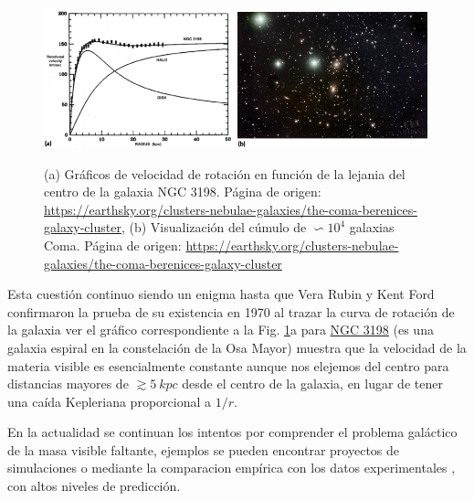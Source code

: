 \begin{figure}
\centering
\includegraphics[width=0.49\textwidth]{Fisica_de_Particulas/imagenes/fritz.png}
\includegraphics[width=0.49\textwidth]{Fisica_de_Particulas/imagenes/Coma-Cluster.jpg}
\caption{(a) Gráficos de velocidad de rotación en función de la lejania del centro de la galaxia NGC 3198. Página de origen: \url{https://earthsky.org/clusters-nebulae-galaxies/the-coma-berenices-galaxy-cluster}, (b) Visualización del cúmulo de $\backsim 10^4$ galaxias Coma. Página de origen: \url{https://earthsky.org/clusters-nebulae-galaxies/the-coma-berenices-galaxy-cluster}}
\label{coma}
\end{figure}
Esta cuestión continuo siendo un enigma hasta que Vera Rubin y Kent Ford confirmaron la prueba de su existencia en 1970 al trazar la curva de rotación de la galaxia ver el gráfico correspondiente a la Fig. \ref{coma}a para \href{https://en.wikipedia.org/wiki/NGC_3198}{NGC 3198} (es una galaxia espiral en la constelación de la Osa Mayor) muestra que la velocidad de la materia visible es esencialmente constante aunque nos elejemos del centro para distancias mayores de $\gtrsim 5 ~kpc$ desde el centro de la galaxia, en lugar de tener una caída Kepleriana proporcional a $1/r$. 

En la actualidad se continuan los intentos por comprender el problema galáctico de la masa visible faltante, ejemplos se pueden encontrar proyectos de simulaciones \citep{deur_relativistic_2020, wu_galactic_2015} o mediante la comparacion empírica con los datos experimentales \cite{mielke_dark_2006}, con altos niveles de predicción.


